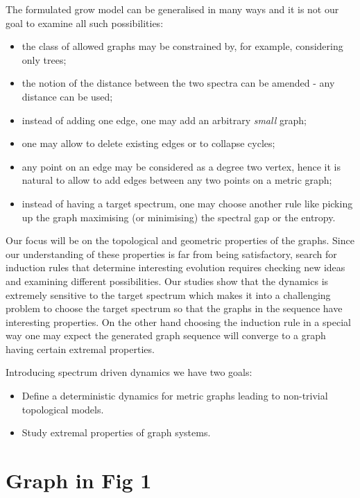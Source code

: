 \documentclass[a4paper]{article}
\begin{document}
  
  
  
  The formulated grow model can be generalised in many ways and it is not our goal to examine all such possibilities:
  \begin{itemize}
  \item the class of allowed graphs may be constrained by, for example, considering only trees;
  \item the notion of the distance between the two spectra can be amended - any distance can be used;
  \item instead of adding one edge, one may add an arbitrary {\it small} graph;
  \item one may allow to delete existing edges or to collapse cycles;
  \item any point on an edge may be considered as a degree two vertex, hence it is natural to allow to add edges between any two points 
  on a metric graph;
  \item instead of having a target spectrum, one may choose another rule like picking up the graph maximising (or minimising) the spectral gap 
  or the entropy. $ $ 
  \end{itemize} 
  
  
  
  
  
  Our focus will be on the topological and geometric properties of the graphs. Since our understanding of these properties is far from being
  satisfactory, search for induction rules that determine interesting evolution requires checking new ideas and  examining different possibilities.
   Our studies show that the dynamics is extremely sensitive to the target spectrum which makes it into a challenging problem to choose the
 target spectrum so that the graphs in the sequence have interesting properties. On the other hand choosing the induction rule in a special way
 one may expect the generated graph sequence will converge to a graph having certain extremal properties. 
  
    
 Introducing spectrum driven dynamics we have two goals:
 \begin{itemize}
 \item Define a deterministic dynamics for metric graphs leading to non-trivial topological models.
 \item Study extremal properties of graph systems.
 \end{itemize}
 



\section*{Graph in Fig 1}
\end{document}
